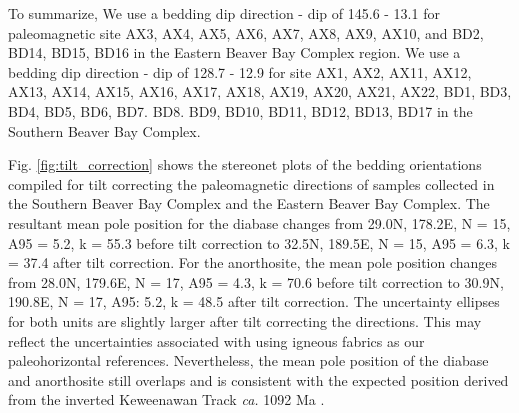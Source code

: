 \documentclass[11pt,letterpaper]{article}
\begin{document}
To summarize, We use a bedding dip direction - dip of 145.6 - 13.1 for paleomagnetic site AX3, AX4, AX5, AX6, AX7, AX8, AX9, AX10, and BD2, BD14, BD15, BD16 in the Eastern Beaver Bay Complex region. We use a bedding dip direction - dip of 128.7 - 12.9 for site AX1, AX2, AX11, AX12, AX13, AX14, AX15, AX16, AX17, AX18, AX19, AX20, AX21, AX22, BD1, BD3, BD4, BD5, BD6, BD7. BD8. BD9, BD10, BD11, BD12, BD13, BD17 in the Southern Beaver Bay Complex.

Fig. \ref{fig:tilt_correction} shows the stereonet plots of the bedding orientations compiled for tilt correcting the paleomagnetic directions of samples collected in the Southern Beaver Bay Complex and the Eastern Beaver Bay Complex. The resultant mean pole position for the diabase changes from 29.0\textdegree N, 178.2\textdegree E, N = 15, A95 = 5.2, k = 55.3 before tilt correction to 32.5\textdegree N, 189.5\textdegree E, N = 15, A95 = 6.3, k = 37.4 after tilt correction. For the anorthosite, the mean pole position changes from 28.0\textdegree N, 179.6\textdegree E, N = 17, A95 = 4.3, k = 70.6 before tilt correction to 30.9\textdegree N, 190.8\textdegree E, N = 17, A95: 5.2, k = 48.5 after tilt correction. The uncertainty ellipses for both units are slightly larger after tilt correcting the directions. This may reflect the uncertainties associated with using igneous fabrics as our paleohorizontal references. Nevertheless, the mean pole position of the diabase and anorthosite still overlaps and is consistent with the expected position derived from the inverted Keweenawan Track \textit{ca.} 1092 Ma \citep{Swanson-Hysell2019a}. 


\clearpage


\clearpage



\end{document}
